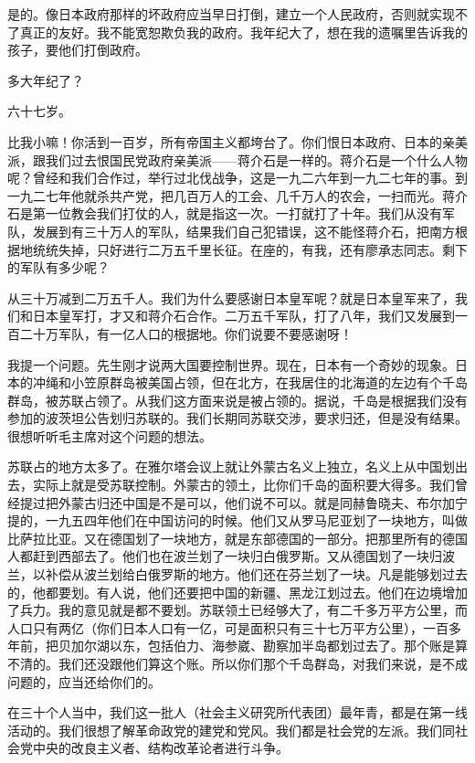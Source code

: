 是的。像日本政府那样的坏政府应当早日打倒，建立一个人民政府，否则就实现不了真正的友好。我不能宽恕欺负我的政府。我年纪大了，想在我的遗嘱里告诉我的孩子，要他们打倒政府。

多大年纪了？

六十七岁。

比我小嘛！你活到一百岁，所有帝国主义都垮台了。你们恨日本政府、日本的亲美派，跟我们过去恨国民党政府亲美派——蒋介石是一样的。蒋介石是一个什么人物呢？曾经和我们合作过，举行过北伐战争，这是一九二六年到一九二七年的事。到一九二七年他就杀共产党，把几百万人的工会、几千万人的农会，一扫而光。蒋介石是第一位教会我们打仗的人，就是指这一次。一打就打了十年。我们从没有军队，发展到有三十万人的军队，结果我们自己犯错误，这不能怪蒋介石，把南方根据地统统失掉，只好进行二万五千里长征。在座的，有我，还有廖承志同志。剩下的军队有多少呢？

从三十万减到二万五千人。我们为什么要感谢日本皇军呢？就是日本皇军来了，我们和日本皇军打，才又和蒋介石合作。二万五千军队，打了八年，我们又发展到一百二十万军队，有一亿人口的根据地。你们说要不要感谢呀！

我提一个问题。先生刚才说两大国要控制世界。现在，日本有一个奇妙的现象。日本的冲绳和小笠原群岛被美国占领，但在北方，在我居住的北海道的左边有个千岛群岛，被苏联占领了。从我们这方面来说是被占领的。据说，千岛是根据我们没有参加的波茨坦公告划归苏联的。我们长期同苏联交涉，要求归还，但是没有结果。很想听听毛主席对这个问题的想法。

苏联占的地方太多了。在雅尔塔会议上就让外蒙古名义上独立，名义上从中国划出去，实际上就是受苏联控制。外蒙古的领土，比你们千岛的面积要大得多。我们曾经提过把外蒙古归还中国是不是可以，他们说不可以。就是同赫鲁晓夫、布尔加宁提的，一九五四年他们在中国访问的时候。他们又从罗马尼亚划了一块地方，叫做比萨拉比亚。又在德国划了一块地方，就是东部德国的一部分。把那里所有的德国人都赶到西部去了。他们也在波兰划了一块归白俄罗斯。又从德国划了一块归波兰，以补偿从波兰划给白俄罗斯的地方。他们还在芬兰划了一块。凡是能够划过去的，他都要划。有人说，他们还要把中国的新疆、黑龙江划过去。他们在边境增加了兵力。我的意见就是都不要划。苏联领土已经够大了，有二千多万平方公里，而人口只有两亿（你们日本人口有一亿，可是面积只有三十七万平方公里），一百多年前，把贝加尔湖以东，包括伯力、海参崴、勘察加半岛都划过去了。那个账是算不清的。我们还没跟他们算这个账。所以你们那个千岛群岛，对我们来说，是不成问题的，应当还给你们的。

在三十个人当中，我们这一批人（社会主义研究所代表团）最年青，都是在第一线活动的。我们很想了解革命政党的建党和党风。我们都是社会党的左派。我们同社会党中央的改良主义者、结构改革论者进行斗争。


